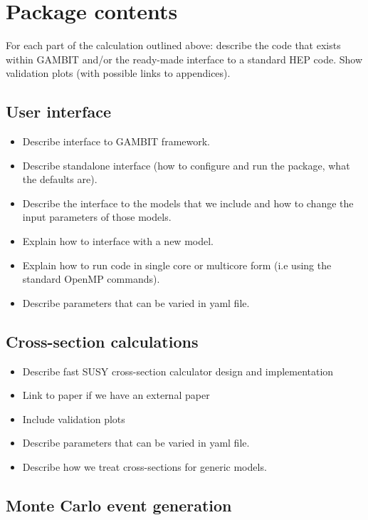 \documentclass[11pt,a4paper]{article}
\begin{document}
\section{Package contents}

For each part of the calculation outlined above: describe the code that exists within GAMBIT and/or the ready-made interface to a standard HEP code. Show validation plots (with possible links to appendices).

\subsection{User interface}

\begin{itemize}
\item Describe interface to GAMBIT framework.
\item Describe standalone interface (how to configure and run the package, what the defaults are).
\item Describe the interface to the models that we include and how to change the input parameters of those models.
\item Explain how to interface with a new model.
\item Explain how to run code in single core or multicore form (i.e using the standard OpenMP commands).
\item Describe parameters that can be varied in yaml file.
\end{itemize}

\subsection{Cross-section calculations}

\begin{itemize}
\item Describe fast SUSY cross-section calculator design and implementation
\item Link to paper if we have an external paper
\item Include validation plots
\item Describe parameters that can be varied in yaml file.
\item Describe how we treat cross-sections for generic models.
\end{itemize}

\subsection{Monte Carlo event generation}
\end{document}
